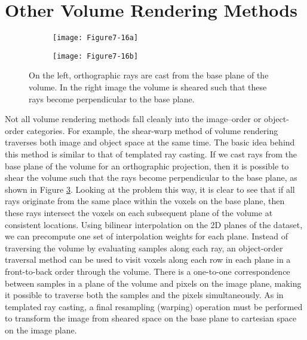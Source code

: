 \section{Other Volume Rendering Methods}

\begin{figure}[!htb]
	\begin{subfigure}[h]{0.48\linewidth}
		\texttt{[image: Figure7-16a]}
		\caption*{}\label{fig:Figure7-16a}
	\end{subfigure}
	\hfill
	\begin{subfigure}[h]{0.48\linewidth}
		\texttt{[image: Figure7-16b]}
		\caption*{}\label{fig:Figure7-16b}
	\end{subfigure}%
	\caption{On the left, orthographic rays are cast from the base plane of the volume. In the right image the volume is sheared such that these rays become perpendicular to the base plane.}\label{fig:Figure7-16}
\end{figure}

Not all volume rendering methods fall cleanly into the image--order or object-order categories. For example, the shear-warp method \cite{Lacroute94} of volume rendering traverses both image and object space at the same time. The basic idea behind this method is similar to that of templated ray casting. If we cast rays from the base plane of the volume for an orthographic projection, then it is possible to shear the volume such that the rays become perpendicular to the base plane, as shown in Figure \ref{fig:Figure7-16}. Looking at the problem this way, it is clear to see that if all rays originate from the same place within the voxels on the base plane, then these rays intersect the voxels on each subsequent plane of the volume at consistent locations. Using bilinear interpolation on the 2D planes of the dataset, we can precompute one set of interpolation weights for each plane. Instead of traversing the volume by evaluating samples along each ray, an object-order traversal method can be used to visit voxels along each row in each plane in a front-to-back order through the volume. There is a one-to-one correspondence between samples in a plane of the volume and pixels on the image plane, making it possible to traverse both the samples and the pixels simultaneously. As in templated ray casting, a final resampling (warping) operation must be performed to transform the image from sheared space on the base plane to cartesian space on the image plane.

